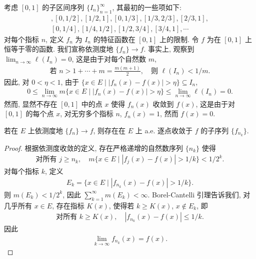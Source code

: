\documentclass[../../main.tex]{subfiles}
\begin{document}
\begin{example}\label{example:ch05-滑动帐篷}
考虑 $[0,1]$ 的子区间序列 $\{I_{n}\}_{n=1}^{\infty}$, 其最初的一些项如下:
\begin{align*}
[0,1],[0,1/2],[1/2,1],[0,1/3],[1/3,2/3],[2/3,1],\\
[0,1/4],[1/4,1/2],[1/2,3/4],[3/4,1],\cdots
\end{align*}
对每个指标 $n$, 定义 $f_{n}$ 为 $I_{n}$ 的特征函数在 $[0,1]$ 上的限制. 令 $f$ 为在 $[0,1]$ 上恒等于零的函数. 我们宣称依测度地 $\{f_{n}\}\to f$. 事实上, 观察到 $\lim_{n\to\infty}\ell(I_{n})=0$, 这是由于对每个自然数 $m$,
\begin{align*}
\text{若 }n>1+\cdots+m=\frac{m(m+1)}{2},\quad\text{则 }\ell(I_{n})<1/m.
\end{align*}
因此, 对 $0<\eta<1$, 由于 $\{x\in E\mid|f_{n}(x)-f(x)|>\eta\}\subseteq I_{n}$,
\begin{align*}
0\leqslant\lim_{n\to\infty}m\{x\in E\mid|f_{n}(x)-f(x)|>\eta\}\leqslant\lim_{n\to\infty}\ell(I_{n})=0.
\end{align*}
然而, 显然不存在 $[0,1]$ 中的点 $x$ 使得 $f_{n}(x)$ 收敛到 $f(x)$, 这是由于对 $[0,1]$ 的每个点 $x$, 对无穷多个指标 $n$, $f_{n}(x)=1$, 然而 $f(x)=0$.
\end{example}

\begin{theorem}[Riesz]\label{theorem:ch05-Riesz}
若在 $E$ 上依测度地 $\{f_{n}\}\to f$, 则存在在 $E$ 上 a.e. 逐点收敛于 $f$ 的子序列 $\{f_{n_{k}}\}$.
\end{theorem}

\begin{proof}
根据依测度收敛的定义, 存在严格递增的自然数序列 $\{n_{k}\}$ 使得
\begin{align*}
\text{对所有 }j\geqslant n_{k},\quad m\{x\in E\mid|f_{j}(x)-f(x)|>1/k\}<1/2^{k}.
\end{align*}
对每个指标 $k$, 定义
\begin{align*}
E_{k}=\{x\in E\mid|f_{n_{k}}(x)-f(x)|>1/k\}.
\end{align*}
则 $m(E_{k})<1/2^{k}$, 因此 $\sum_{k=1}^{\infty}m(E_{k})<\infty$. Borel-Cantelli 引理告诉我们, 对几乎所有 $x\in E$, 存在指标 $K(x)$, 使得若 $k\geqslant K(x)$, $x\notin E_{k}$, 即
\begin{align*}
\text{对所有 }k\geqslant K(x),\quad|f_{n_{k}}(x)-f(x)|\leqslant 1/k.
\end{align*}
因此
\begin{align*}
\lim_{k\to\infty}f_{n_{k}}(x)=f(x).
\end{align*}
\end{proof}
\end{document}
